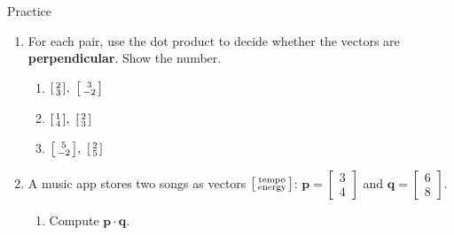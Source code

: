 \documentclass[10pt]{article}
\begin{document}
\begin{notesbox}{Practice}
\begin{enumerate}[leftmargin=1.9em, itemsep=10pt]
\begin{work}
                      \theta &= 135^\circ
\end{work}
  \item For each pair, use the dot product to decide whether the vectors are
        \textbf{perpendicular}. Show the number.
    \begin{enumerate}[label=(\alph*), leftmargin=1.8em, itemsep=4pt]
      \item $\begin{bsmallmatrix} 2 \\ 3 \end{bsmallmatrix},\ \begin{bsmallmatrix} 3 \\ -2 \end{bsmallmatrix}$ \hfill
      \item $\begin{bsmallmatrix} 1 \\ 4 \end{bsmallmatrix},\ \begin{bsmallmatrix} 2 \\ 3 \end{bsmallmatrix}$ \hfill
      \item $\begin{bsmallmatrix} 5 \\ -2 \end{bsmallmatrix},\ \begin{bsmallmatrix} 2 \\ 5 \end{bsmallmatrix}$
    \end{enumerate}
  \item A music app stores two songs as vectors
        $\begin{bsmallmatrix} \text{tempo} \\ \text{energy} \end{bsmallmatrix}$:
        $\mathbf{p}=\begin{bmatrix} 3 \\ 4 \end{bmatrix}$ and
        $\mathbf{q}=\begin{bmatrix} 6 \\ 8 \end{bmatrix}$.
    \begin{enumerate}[label=(\alph*), leftmargin=1.8em, itemsep=5pt]
      \item Compute $\mathbf{p}\cdot\mathbf{q}$.
\begin{work}

\end{work}
\end{enumerate}
\end{enumerate}
\end{notesbox}
\end{document}
